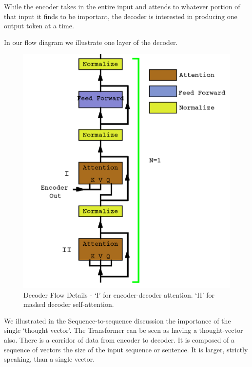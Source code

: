 While the encoder takes in the entire input and attends to whatever portion of that input it finds to be important, the decoder is interested in producing one output token at a time. 

In our flow diagram we illustrate one layer of the decoder.

\begin{figure}[H]
	\begin{center}
		
		
		\includegraphics[scale=1.25]{diagram-flow-decoder02}
	\end{center}
	\caption[Decoder Flow]{Decoder Flow Details - `I' for encoder-decoder attention. `II' for masked decoder self-attention.}
	
	
\end{figure}


We illustrated in the Sequence-to-sequence discussion the importance of the single `thought vector'. The Transformer can be seen as having a thought-vector also. There is a corridor of data from encoder to decoder. It is composed of a sequence of vectors the size of the input sequence or sentence. It is larger, strictly speaking, than a single vector.

